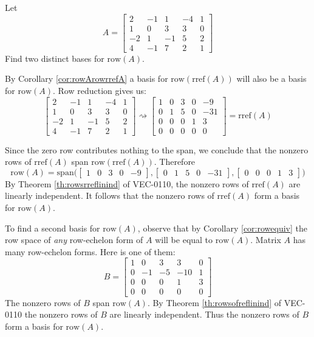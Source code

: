 \documentclass{ximera}
\begin{document}
\begin{example}\label{ex:basisrowspace}
Let
$$A=\begin{bmatrix}2&-1&1&-4&1\\1&0&3&3&0\\-2&1&-1&5&2\\4&-1&7&2&1\end{bmatrix}$$
Find two distinct bases for $\mbox{row}(A)$.
\begin{explanation}
By Corollary \ref{cor:rowArowrrefA} a basis for $\mbox{row}(\mbox{rref}(A))$ will also be a basis for $\mbox{row}(A)$. Row reduction gives us:
$$\begin{bmatrix}2&-1&1&-4&1\\1&0&3&3&0\\-2&1&-1&5&2\\4&-1&7&2&1\end{bmatrix}\rightsquigarrow\begin{bmatrix}1&0&3&0&-9\\0&1&5&0&-31\\0&0&0&1&3\\0&0&0&0&0\end{bmatrix}=\mbox{rref}(A)$$

Since the zero row contributes nothing to the span, we conclude that the nonzero rows of $\mbox{rref}(A)$ span $\mbox{row}(\mbox{rref}(A))$.  Therefore
$$\mbox{row}(A)=\mbox{span}\Big(\begin{bmatrix}1&0&3&0&-9\end{bmatrix},
\begin{bmatrix}0&1&5&0&-31\end{bmatrix},
\begin{bmatrix}0&0&0&1&3\end{bmatrix}\Big)$$
By Theorem \ref{th:rowsrreflinind} of VEC-0110, the nonzero rows of $\mbox{rref}(A)$ are linearly independent.
It follows that the nonzero rows of $\mbox{rref}(A)$ form a basis for $\mbox{row}(A)$.

To find a second basis for $\mbox{row}(A)$, observe that by Corollary \ref{cor:rowequiv} the row space of {\it any} row-echelon form of $A$ will be equal to $\mbox{row}(A)$.  Matrix $A$ has many row-echelon forms.  Here is one of them:
$$B=\begin{bmatrix}1&0&3&3&0\\0&-1&-5&-10&1\\0&0&0&1&3\\0&0&0&0&0 \end{bmatrix}$$
The nonzero rows of $B$ span $\mbox{row}(A)$.  By Theorem \ref{th:rowsofreflinind} of VEC-0110 the nonzero rows of $B$ are linearly independent.  Thus the nonzero rows of $B$ form a basis for $\mbox{row}(A)$.
\end{explanation}
\end{example}
\end{document}
